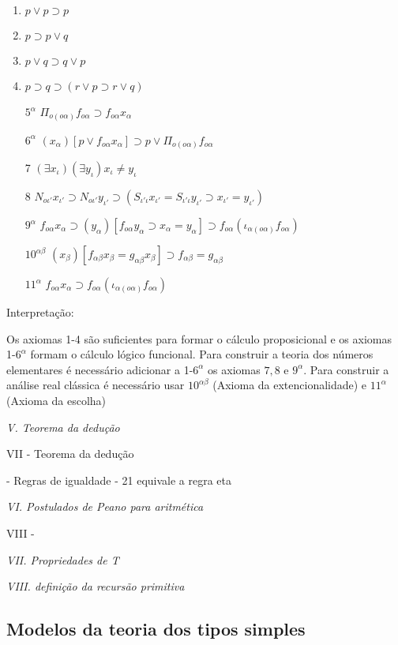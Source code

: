 \documentclass[../main.tex]{subfiles}
\begin{document}
\begin{enumerate}
    \item $p \lor p \supset p$
    \item $p \supset p \lor q$
    \item $p \lor q \supset q \lor p$
    \item $p \supset q \supset (r \lor p \supset r \lor q)$
    \item[$5^{\alpha}$] $\Pi_{o(o\alpha)}f_{o\alpha} \supset f_{o\alpha}x_{\alpha}$
    \item[$6^{\alpha}$] $(x_\alpha)[p \lor f_{o\alpha}x_{\alpha}] \supset p \lor \Pi_{o(o\alpha)}f_{o\alpha}$
    \item[7] $(\exists x_{\iota})(\exists y_{\iota}) x_{\iota} \neq y_{\iota} $
    \item[8] $N_{o \iota'}x_{\iota'} \supset N_{o \iota'}y_{\iota'} \supset (S_{\iota'\iota}x_{\iota'} = S_{\iota'\iota}y_{\iota'} \supset x_{\iota'} = y_{\iota'})$
    \item[$9^{\alpha}$] $f_{o \alpha} x_{\alpha} \supset (y_{\alpha}) [f_{o \alpha}y_{\alpha} \supset x_{\alpha} = y_{\alpha}] \supset f_{o \alpha} (\iota_{\alpha(o \alpha)} f_{o \alpha})$
    \item[$10^{\alpha\beta}$] $(x_{\beta})[f_{\alpha\beta} x_{\beta} = g_{\alpha\beta} x_{\beta}] \supset f_{\alpha\beta} = g_{\alpha\beta}$ 
    \item[$11^{\alpha}$] $f_{o \alpha} x_{\alpha} \supset f_{o \alpha} (\iota_{\alpha(o \alpha)} f_{o \alpha})$
\end{enumerate}

Interpretação:

Os axiomas 1-4 são suficientes para formar o cálculo proposicional e os axiomas 1-$6^{\alpha}$ formam o cálculo lógico funcional. Para construir a teoria dos números elementares é necessário adicionar a 1-$6^{\alpha}$ os axiomas $7, 8$ e $9^{\alpha}$. Para construir a análise real clássica é necessário usar $10^{\alpha\beta}$ (Axioma da extencionalidade) e $11^{\alpha}$ (Axioma da escolha)

\emph{V. Teorema da dedução}

VII - Teorema da dedução

- Regras de igualdade
- 21 equivale a regra eta


\emph{VI. Postulados de Peano para aritmética}

VIII - 

\emph{VII. Propriedades de T}

\emph{VIII. definição da recursão primitiva}


\subsection{Modelos da teoria dos tipos simples}
\end{document}
